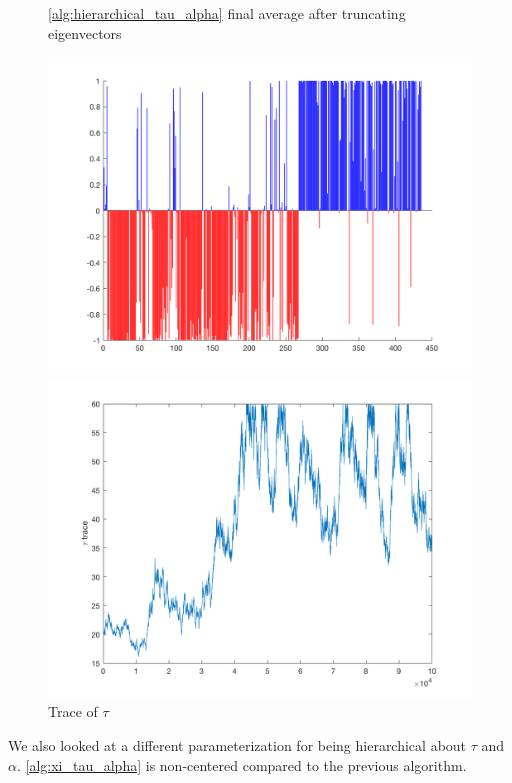 \documentclass{siamart1116}
\begin{document}
\begin{figure}[H]
\begin{minipage}{0.48\textwidth}
    \caption{\label{fig:centered_voting_avg} \cref{alg:hierarchical_tau_alpha} final average after truncating eigenvectors}
    \includegraphics[width=\linewidth]{centered/final_avg.png}
\end{minipage}\hfill
\begin{minipage}{0.48\textwidth}
    \caption{\label{fig:centered_voting_tau} Trace of $\tau$}
    \includegraphics[width=\linewidth]{centered/trace_tau.png}
\end{minipage}
\end{figure}

We also looked at a different parameterization for being hierarchical about $\tau$ and $\alpha$. \cref{alg:xi_tau_alpha} is non-centered compared to the previous algorithm.
\end{document}
